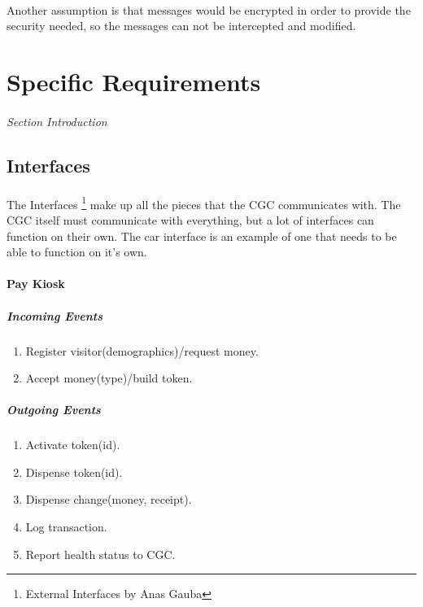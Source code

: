 \documentclass[12pt]{article}
\begin{document}
	\paragraph{} Another assumption is that messages would be encrypted in order 
	to provide the security needed, so the messages can not be intercepted and 
	modified.

\section{Specific Requirements} \label{spec} %
\paragraph{} \textit{Section Introduction}

	\subsection{Interfaces} \label{inter}%
	\paragraph{} The Interfaces \footnote{External Interfaces by Anas Gauba} 
	make up all the pieces that the CGC communicates with. The CGC itself must 
	communicate with everything, 	but a lot of interfaces can function on their own. The 
	car interface is an example of one that needs to be able to function on it's own.
		
	\paragraph{Pay Kiosk}
	\textit{}
	    \subparagraph{Incoming Events}
		\begin{enumerate}
		    \item Register visitor(demographics)/request money.
		    \item Accept money(type)/build token.
		\end{enumerate}
				
	    \subparagraph{Outgoing Events}
		\begin{enumerate}
            \item Activate token(id).
            \item Dispense token(id). 
            \item Dispense change(money, receipt).
            \item Log transaction. 
            \item Report health status to CGC. 
		\end{enumerate}
\end{document}
